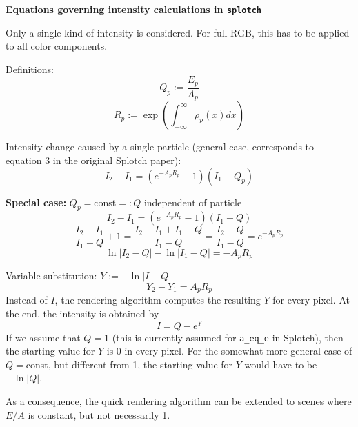 \documentclass{report}
\begin{document}
{\bf \large Equations governing intensity calculations in {\tt splotch}}

Only a single kind of intensity is considered. For full RGB, this has to be
applied to all color components.

Definitions:
\begin{equation}
Q_p := \frac{E_p}{A_p}
\end{equation}
\begin{equation}
R_p := \exp\left(\int_{-\infty}^{\infty}\rho_p(x)dx\right)
\end{equation}

Intensity change caused by a single particle (general case, corresponds to
equation 3 in the original Splotch paper):
\begin{equation}
I_2-I_1=\left(e^{-A_p R_p}-1\right)(I_1-Q_p)
\end{equation}

{\bf Special case:} $Q_p=$const$=:Q$ independent of particle
\begin{equation}
I_2-I_1=\left(e^{-A_p R_p}-1\right)(I_1-Q)
\end{equation}
\begin{equation}
\frac{I_2-I_1}{I_1-Q} + 1=\frac{I_2-I_1 + I_1-Q}{I_1-Q}=\frac{I_2-Q}{I_1-Q}=e^{-A_p R_p}
\end{equation}
\begin{equation}
\ln|I_2-Q|-\ln|I_1-Q|=-A_p R_p
\end{equation}

Variable substitution: $Y:=-\ln|I-Q|$
\begin{equation}
Y_2-Y_1=A_p R_p
\end{equation}
Instead of $I$, the rendering algorithm computes the resulting $Y$
for every pixel.
At the end, the intensity is obtained by
\begin{equation}
I=Q-e^Y
\end{equation}
If we assume that $Q=1$ (this is currently assumed for {\tt a\_eq\_e} in Splotch),
then the starting value for $Y$ is 0 in every pixel.
For the somewhat more general case of $Q=$const, but different from 1, the starting
value for $Y$ would have to be $-\ln|Q|$.

As a consequence, the quick rendering algorithm can be extended to scenes where
$E/A$ is constant, but not necessarily 1.
\end{document}
